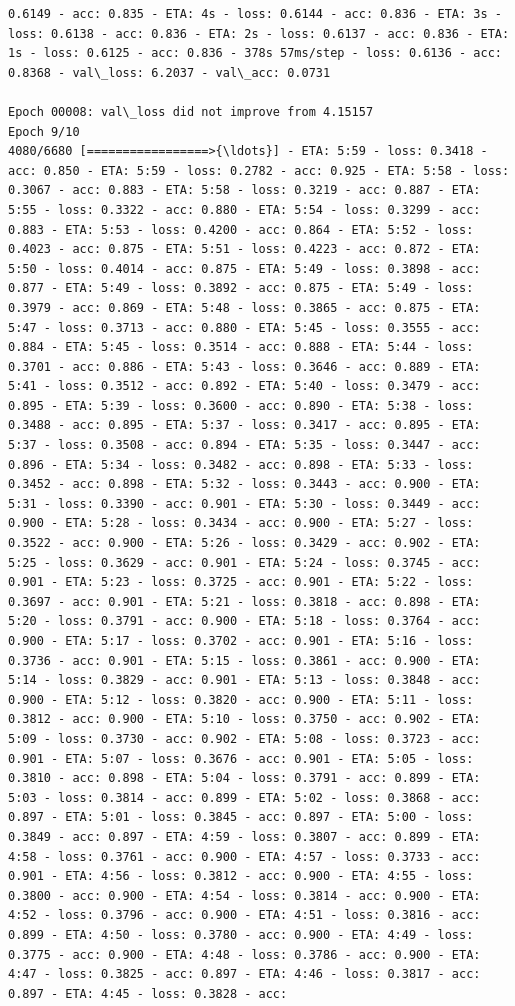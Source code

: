 \documentclass[11pt]{article}
\begin{document}
\begin{Verbatim}[commandchars=\\\{\}]
0.6149 - acc: 0.835 - ETA: 4s - loss: 0.6144 - acc: 0.836 - ETA: 3s - loss: 0.6138 - acc: 0.836 - ETA: 2s - loss: 0.6137 - acc: 0.836 - ETA: 1s - loss: 0.6125 - acc: 0.836 - 378s 57ms/step - loss: 0.6136 - acc: 0.8368 - val\_loss: 6.2037 - val\_acc: 0.0731

Epoch 00008: val\_loss did not improve from 4.15157
Epoch 9/10
4080/6680 [=================>{\ldots}] - ETA: 5:59 - loss: 0.3418 - acc: 0.850 - ETA: 5:59 - loss: 0.2782 - acc: 0.925 - ETA: 5:58 - loss: 0.3067 - acc: 0.883 - ETA: 5:58 - loss: 0.3219 - acc: 0.887 - ETA: 5:55 - loss: 0.3322 - acc: 0.880 - ETA: 5:54 - loss: 0.3299 - acc: 0.883 - ETA: 5:53 - loss: 0.4200 - acc: 0.864 - ETA: 5:52 - loss: 0.4023 - acc: 0.875 - ETA: 5:51 - loss: 0.4223 - acc: 0.872 - ETA: 5:50 - loss: 0.4014 - acc: 0.875 - ETA: 5:49 - loss: 0.3898 - acc: 0.877 - ETA: 5:49 - loss: 0.3892 - acc: 0.875 - ETA: 5:49 - loss: 0.3979 - acc: 0.869 - ETA: 5:48 - loss: 0.3865 - acc: 0.875 - ETA: 5:47 - loss: 0.3713 - acc: 0.880 - ETA: 5:45 - loss: 0.3555 - acc: 0.884 - ETA: 5:45 - loss: 0.3514 - acc: 0.888 - ETA: 5:44 - loss: 0.3701 - acc: 0.886 - ETA: 5:43 - loss: 0.3646 - acc: 0.889 - ETA: 5:41 - loss: 0.3512 - acc: 0.892 - ETA: 5:40 - loss: 0.3479 - acc: 0.895 - ETA: 5:39 - loss: 0.3600 - acc: 0.890 - ETA: 5:38 - loss: 0.3488 - acc: 0.895 - ETA: 5:37 - loss: 0.3417 - acc: 0.895 - ETA: 5:37 - loss: 0.3508 - acc: 0.894 - ETA: 5:35 - loss: 0.3447 - acc: 0.896 - ETA: 5:34 - loss: 0.3482 - acc: 0.898 - ETA: 5:33 - loss: 0.3452 - acc: 0.898 - ETA: 5:32 - loss: 0.3443 - acc: 0.900 - ETA: 5:31 - loss: 0.3390 - acc: 0.901 - ETA: 5:30 - loss: 0.3449 - acc: 0.900 - ETA: 5:28 - loss: 0.3434 - acc: 0.900 - ETA: 5:27 - loss: 0.3522 - acc: 0.900 - ETA: 5:26 - loss: 0.3429 - acc: 0.902 - ETA: 5:25 - loss: 0.3629 - acc: 0.901 - ETA: 5:24 - loss: 0.3745 - acc: 0.901 - ETA: 5:23 - loss: 0.3725 - acc: 0.901 - ETA: 5:22 - loss: 0.3697 - acc: 0.901 - ETA: 5:21 - loss: 0.3818 - acc: 0.898 - ETA: 5:20 - loss: 0.3791 - acc: 0.900 - ETA: 5:18 - loss: 0.3764 - acc: 0.900 - ETA: 5:17 - loss: 0.3702 - acc: 0.901 - ETA: 5:16 - loss: 0.3736 - acc: 0.901 - ETA: 5:15 - loss: 0.3861 - acc: 0.900 - ETA: 5:14 - loss: 0.3829 - acc: 0.901 - ETA: 5:13 - loss: 0.3848 - acc: 0.900 - ETA: 5:12 - loss: 0.3820 - acc: 0.900 - ETA: 5:11 - loss: 0.3812 - acc: 0.900 - ETA: 5:10 - loss: 0.3750 - acc: 0.902 - ETA: 5:09 - loss: 0.3730 - acc: 0.902 - ETA: 5:08 - loss: 0.3723 - acc: 0.901 - ETA: 5:07 - loss: 0.3676 - acc: 0.901 - ETA: 5:05 - loss: 0.3810 - acc: 0.898 - ETA: 5:04 - loss: 0.3791 - acc: 0.899 - ETA: 5:03 - loss: 0.3814 - acc: 0.899 - ETA: 5:02 - loss: 0.3868 - acc: 0.897 - ETA: 5:01 - loss: 0.3845 - acc: 0.897 - ETA: 5:00 - loss: 0.3849 - acc: 0.897 - ETA: 4:59 - loss: 0.3807 - acc: 0.899 - ETA: 4:58 - loss: 0.3761 - acc: 0.900 - ETA: 4:57 - loss: 0.3733 - acc: 0.901 - ETA: 4:56 - loss: 0.3812 - acc: 0.900 - ETA: 4:55 - loss: 0.3800 - acc: 0.900 - ETA: 4:54 - loss: 0.3814 - acc: 0.900 - ETA: 4:52 - loss: 0.3796 - acc: 0.900 - ETA: 4:51 - loss: 0.3816 - acc: 0.899 - ETA: 4:50 - loss: 0.3780 - acc: 0.900 - ETA: 4:49 - loss: 0.3775 - acc: 0.900 - ETA: 4:48 - loss: 0.3786 - acc: 0.900 - ETA: 4:47 - loss: 0.3825 - acc: 0.897 - ETA: 4:46 - loss: 0.3817 - acc: 0.897 - ETA: 4:45 - loss: 0.3828 - acc: 
\end{Verbatim}
\end{document}
